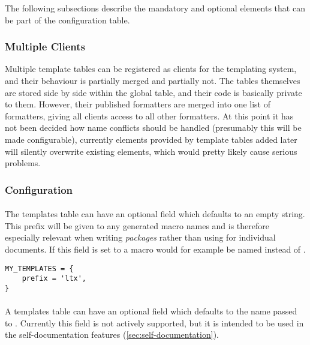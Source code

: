 \documentclass{scrartcl}
\begin{document}
The following subsections describe the mandatory and optional elements that can
be part of the configuration table.


\subsubsection{Multiple Clients}
\label{sec:multiple-clients}

Multiple template tables can be registered as clients for the templating system,
and their behaviour is partially merged and partially not.  The tables
themselves are stored side by side within the global  table,
and their code is basically private to them.  However, their published
formatters are merged into one list of formatters, giving all clients access to
all other formatters.  At this point it has not been decided how name conflicts
should be handled (presumably this will be made configurable), currently
elements provided by template tables added later will silently overwrite
existing elements, which would pretty likely cause serious problems.


\subsubsection{Configuration}
\label{sec:templates-table-configuration}

\paragraph{}

The templates table can have an optional field  which
defaults to an empty string.  This prefix will be given to any generated macro
names and is therefore especially relevant when writing \emph{packages} rather
than using  for individual documents.  If this field is
set to  a macro would for example be named  instead
of .

\begin{verbatim}
MY_TEMPLATES = {
    prefix = 'ltx',
}
\end{verbatim}


\paragraph{}

A templates table can have an optional field  which
defaults to the name passed to \texttt{\addLuaTemplates}.  Currently
this field is not actively supported, but it is intended to be used in the
self-documentation features (\vref{sec:self-documentation}).
\end{document}
